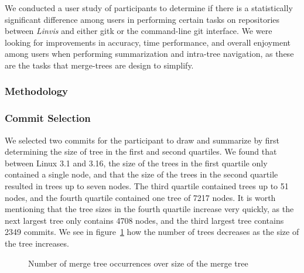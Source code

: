 We conducted a user study of  participants to determine if
there is a statistically significant difference among users in
performing certain tasks on repositories between \textit{Linvis} and
either gitk or the command-line git interface. We were looking for
improvements in accuracy, time performance, and overall enjoyment among
users when performing summarization and intra-tree navigation, as these
are the tasks that merge-trees are design to simplify.



\subsubsection{Methodology}
\label{ssub:methodology}

\subsubsection{Commit Selection}
\label{ssub:commit_selection}

We selected two commits for the participant to draw and summarize by
first determining the size of tree in the first and second quartiles. We
found that between Linux 3.1 and 3.16, the size of the trees in the
first quartile only contained a single node, and that the size of the
trees in the second quartile resulted in trees up to seven nodes. The
third quartile contained trees up to 51 nodes, and the fourth quartile
contained one tree of 7217 nodes. It is worth mentioning that the tree
sizes in the fourth quartile increase very quickly, as the next largest
tree only contains 4708 nodes, and the third largest tree contains 2349
commits. We see in figure~\ref{fig:tree_size} how the number of trees
decreases as the size of the tree increases.

\begin{figure}[htpb]
\begin{center}
\caption{Number of merge tree occurrences over size of the merge tree}
\label{fig:tree_size}
\end{center}
\end{figure}

